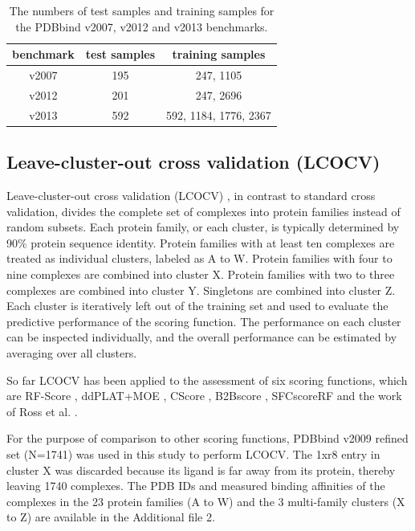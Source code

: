 \begin{table}
\caption{The numbers of test samples and training samples for the PDBbind v2007, v2012 and v2013 benchmarks.}
\label{rfcyscore:benchmarks}
\begin{tabular}{ccc}
\hline
benchmark & test samples & training samples\\
\hline
v2007 & 195 & 247, 1105\\
v2012 & 201 & 247, 2696\\
v2013 & 592 & 592, 1184, 1776, 2367\\
\hline
\end{tabular}
\end{table}

\subsection{Leave-cluster-out cross validation (LCOCV)}

Leave-cluster-out cross validation (LCOCV) \citep{774}, in contrast to standard cross validation, divides the complete set of complexes into protein families instead of random subsets. Each protein family, or each cluster, is typically determined by 90\% protein sequence identity. Protein families with at least ten complexes are treated as individual clusters, labeled as A to W. Protein families with four to nine complexes are combined into cluster X. Protein families with two to three complexes are combined into cluster Y. Singletons are combined into cluster Z. Each cluster is iteratively left out of the training set and used to evaluate the predictive performance of the scoring function. The performance on each cluster can be inspected individually, and the overall performance can be estimated by averaging over all clusters.

So far LCOCV has been applied to the assessment of six scoring functions, which are RF-Score \citep{774,1194,1410}, ddPLAT+MOE \citep{1414}, CScore \citep{1194}, B2Bscore \citep{1410}, SFCscoreRF \citep{1347} and the work of Ross et al. \citep{1415}.

For the purpose of comparison to other scoring functions, PDBbind v2009 refined set (N=1741) was used in this study to perform LCOCV. The 1xr8 entry in cluster X was discarded because its ligand is far away from its protein, thereby leaving 1740 complexes. The PDB IDs and measured binding affinities of the complexes in the 23 protein families (A to W) and the 3 multi-family clusters (X to Z) are available in the Additional file 2.

